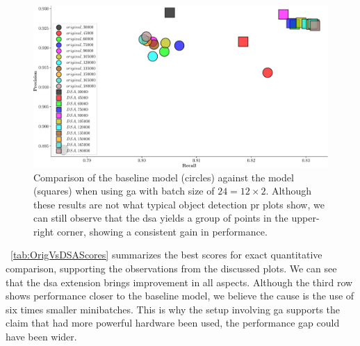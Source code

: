 \begin{figure}[t]
  \centerline{\includegraphics[width=\linewidth]{figures/siamese_tracking/tracker_cmp_160_2x12_vs_160_2x2_DSA_GA_rec_prec.pdf}}
  \caption[\gls{dsa} evaluation with \gls{ga} - secondary metrics]{Comparison of the baseline model (circles) against the \dsamodel{} model (squares) when using \gls{ga} with batch size of $24 = 12 \times 2$. Although these results are not what typical object detection \gls{pr} plots show, we can still observe that the \gls{dsa} yields a group of points in the upper-right corner, showing a consistent gain in performance.}
  \label{fig:OrigVsDSA_160RPN_GA_Prec_Rec}
\end{figure}

\tabletext{}~\ref{tab:OrigVsDSAScores} summarizes the best scores for exact quantitative comparison, supporting the observations from the discussed plots. We can see that the \gls{dsa} extension brings improvement in all aspects. Although the third row shows performance closer to the baseline model, we believe the cause is the use of six times smaller minibatches. This is why the setup involving \gls{ga} supports the claim that had more powerful hardware been used, the performance gap could have been wider.

